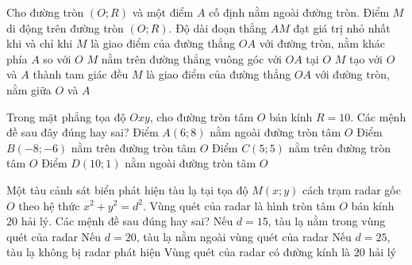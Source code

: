 \begin{ex}%
	Cho đường tròn $(O; R)$ và một điểm $A$ cố định nằm ngoài đường tròn. Điểm $M$ di động trên đường tròn $(O; R)$. Độ dài đoạn thẳng $AM$ đạt giá trị nhỏ nhất khi và chỉ khi
	\choice
	{$M$ là giao điểm của đường thẳng $OA$ với đường tròn, nằm khác phía $A$ so với $O$}
	{$M$ nằm trên đường thẳng vuông góc với $OA$ tại $O$}
	{$M$ tạo với $O$ và $A$ thành tam giác đều}
	{\True $M$ là giao điểm của đường thẳng $OA$ với đường tròn, nằm giữa $O$ và $A$}
\end{ex}

\begin{ex}%
	Trong mặt phẳng tọa độ $Oxy$, cho đường tròn tâm $O$ bán kính $R = 10$. Các mệnh đề sau đây đúng hay sai?
	\choiceTF
	{Điểm $A(6; 8)$ nằm ngoài đường tròn tâm $O$}
	{\True Điểm $B(-8; -6)$ nằm trên đường tròn tâm $O$}
	{Điểm $C(5; 5)$ nằm trên đường tròn tâm $O$}
	{\True Điểm $D(10; 1)$ nằm ngoài đường tròn tâm $O$}
\end{ex}

\begin{ex}%
	Một tàu cảnh sát biển phát hiện tàu lạ tại tọa độ $M(x; y)$ cách trạm radar gốc $O$ theo hệ thức $x^2 + y^2 = d^2$. Vùng quét của radar là hình tròn tâm $O$ bán kính $20\text{ hải lý}$. Các mệnh đề sau đúng hay sai?
	\choiceTF
	{\True Nếu $d = 15$, tàu lạ nằm trong vùng quét của radar}
	{Nếu $d = 20$, tàu lạ nằm ngoài vùng quét của radar}
	{\True Nếu $d = 25$, tàu lạ không bị radar phát hiện}
	{Vùng quét của radar có đường kính là $20\text{ hải lý}$}
\end{ex}

